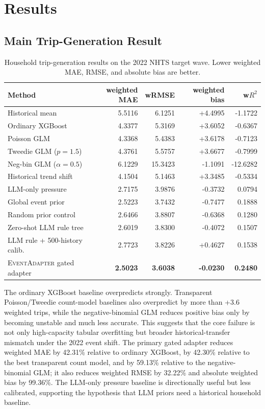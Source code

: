 \documentclass[11pt]{article}
\newcommand{\nhts}{\textsc{NHTS}}
\newcommand{\method}{\textsc{EventAdapter}}
\newcommand{\whmae}{weighted MAE}
\newcommand{\whbias}{weighted bias}
\begin{document}
\section{Results}

\subsection{Main Trip-Generation Result}

\begin{table}[t]
\centering
\caption{Household trip-generation results on the 2022 \nhts{} target wave. Lower \whmae{}, RMSE, and absolute bias are better.}
\label{tab:main_results}
\small
\setlength{\tabcolsep}{3.6pt}
\begin{tabular}{lrrrr}
\toprule
Method & \whmae{} & wRMSE & \whbias{} & w$R^2$ \\
\midrule
Historical mean & 5.5116 & 6.1251 & +4.4995 & -1.1722 \\
Ordinary XGBoost & 4.3377 & 5.3169 & +3.6052 & -0.6367 \\
Poisson GLM & 4.3368 & 5.4383 & +3.6178 & -0.7123 \\
Tweedie GLM ($p=1.5$) & 4.3761 & 5.5757 & +3.6677 & -0.7999 \\
Neg-bin GLM ($\alpha=0.5$) & 6.1229 & 15.3423 & -1.1091 & -12.6282 \\
Historical trend shift & 4.1504 & 5.1463 & +3.3485 & -0.5334 \\
LLM-only pressure & 2.7175 & 3.9876 & -0.3732 & 0.0794 \\
Global event prior & 2.5223 & 3.7432 & -0.7477 & 0.1888 \\
Random prior control & 2.6466 & 3.8807 & -0.6368 & 0.1280 \\
Zero-shot LLM rule tree & 2.6019 & 3.8300 & -0.4072 & 0.1507 \\
LLM rule + 500-history calib. & 2.7723 & 3.8226 & +0.4627 & 0.1538 \\
\method{} gated adapter & \textbf{2.5023} & \textbf{3.6038} & \textbf{-0.0230} & \textbf{0.2480} \\
\bottomrule
\end{tabular}
\end{table}

The ordinary XGBoost baseline overpredicts strongly.
Transparent Poisson/Tweedie count-model baselines also overpredict by more than +3.6 weighted trips, while the negative-binomial GLM reduces positive bias only by becoming unstable and much less accurate.
This suggests that the core failure is not only high-capacity tabular overfitting but broader historical-transfer mismatch under the 2022 event shift.
The primary gated adapter reduces \whmae{} by 42.31\% relative to ordinary XGBoost, by 42.30\% relative to the best transparent count model, and by 59.13\% relative to the negative-binomial GLM; it also reduces weighted RMSE by 32.22\% and absolute weighted bias by 99.36\%.
The LLM-only pressure baseline is directionally useful but less calibrated, supporting the hypothesis that LLM priors need a historical household baseline.
\end{document}
